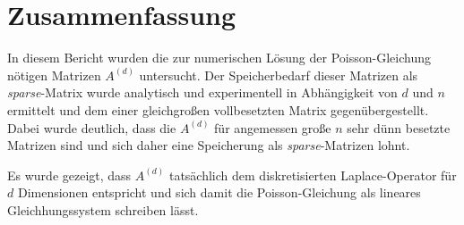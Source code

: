\documentclass[smallheadings]{scrartcl}
\numberwithin{equation}{section}
\begin{document}
\section{Zusammenfassung}

In diesem Bericht wurden die zur numerischen Lösung der Poisson-Gleichung nötigen Matrizen $A^{(d)}$ untersucht. Der Speicherbedarf dieser Matrizen als \textit{sparse}-Matrix wurde analytisch und experimentell in Abhängigkeit von $d$ und $n$ ermittelt und dem einer gleichgroßen vollbesetzten Matrix gegenübergestellt. Dabei wurde deutlich, dass die $A^{(d)}$ für angemessen große $n$ sehr dünn besetzte Matrizen sind und sich daher eine Speicherung als \textit{sparse}-Matrizen lohnt. 

Es wurde gezeigt, dass $A^{(d)}$ tatsächlich dem diskretisierten Laplace-Operator für $d$ Dimensionen entspricht und sich damit die Poisson-Gleichung als lineares Gleichhungssystem schreiben lässt. 

\cleardoublepage
\appendix
\end{document}
